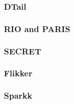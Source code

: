 \subsubsection*{\textbf{DTail}}
\label{par:dtail}


\subsubsection*{\textbf{RIO and PARIS}}
\label{par:rioparis}


\subsubsection*{\textbf{SECRET}}
\label{par:secret}


\subsubsection*{\textbf{Flikker}}
\label{par:flikker}


\subsubsection*{\textbf{Sparkk}}
\label{par:sparkk}
